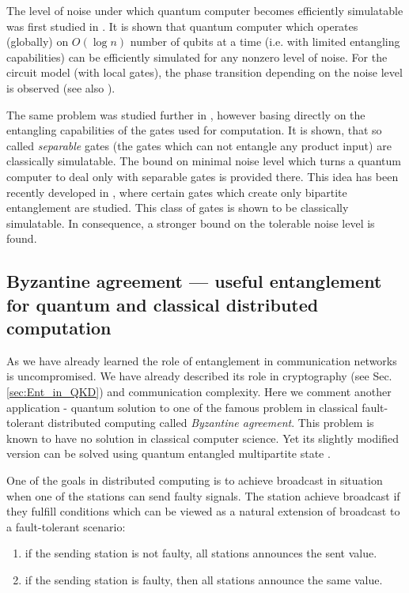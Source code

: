 \documentclass[twocolumn,aps,rmp]{revtex4}
\begin{document}
The level of noise under which quantum computer becomes efficiently
simulatable was first studied in \cite{Aharonov-comp}. It is shown
that quantum computer which operates (globally) on $O(\log n)$ number
of qubits at a time (i.e. with limited entangling capabilities) can be
efficiently simulated for any nonzero level of noise. For the circuit
model (with local gates), the phase transition depending on the noise
level is observed (see also \cite{Aharonov-comp2}).

The same problem was studied further in \cite{HarrowN2003-robust},
however basing directly on the entangling capabilities of the gates
used for computation. It is shown, that so called {\it separable}
gates (the gates which can not entangle any product input) are
classically simulatable. The bound on minimal noise level which turns
a quantum computer to deal only with separable gates is provided
there. This idea has been recently developed in
\cite{VirmaniHP-comp-ent2005}, where certain gates which create only
bipartite entanglement are studied. This class of gates is shown to be
classically simulatable. In consequence, a stronger bound on the
tolerable noise level is found.



\subsection{Byzantine agreement --- useful entanglement for quantum and
classical distributed computation}

As we have already learned the role of entanglement  in
communication networks is uncompromised. We have already described
its role in cryptography (see Sec. \ref{sec:Ent_in_QKD}) and
communication complexity. Here we comment another application -
quantum solution to one of the famous problem in classical
fault-tolerant distributed computing called {\it Byzantine
agreement}. This problem is known to have no solution in classical
computer science. Yet its slightly modified version can be solved
using quantum entangled multipartite state \cite{Gisin01-byzantine}.

One of the goals in distributed computing is to achieve broadcast in
situation when one of the stations can send faulty signals. The
station achieve broadcast if they fulfill conditions which can be
viewed as a natural extension of broadcast to a fault-tolerant
scenario:

\begin{enumerate}
\item if the sending station is not faulty, all stations announces the
  sent value.
\item if the sending station is faulty, then all stations announce the
  same value.
\end{enumerate}
\end{document}
